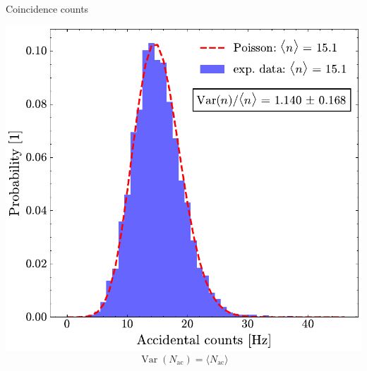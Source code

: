 \documentclass[10pt,aspectratio=43]{beamer}
\begin{document}
\begin{frame}{Coincidence counts}
\begin{minipage}{.45\textwidth}
			\includegraphics[width=\textwidth]{Images/AccCountsStatistics_2.pdf}
			\vspace*{-2.5em}
			\begin{equation*}
				\operatorname{Var}\!\left(N_{\text{ac}}\right) = \langle N_{\text{ac}} \rangle
			\end{equation*}
		\end{minipage}
	\end{frame}
	
	
\end{document}
